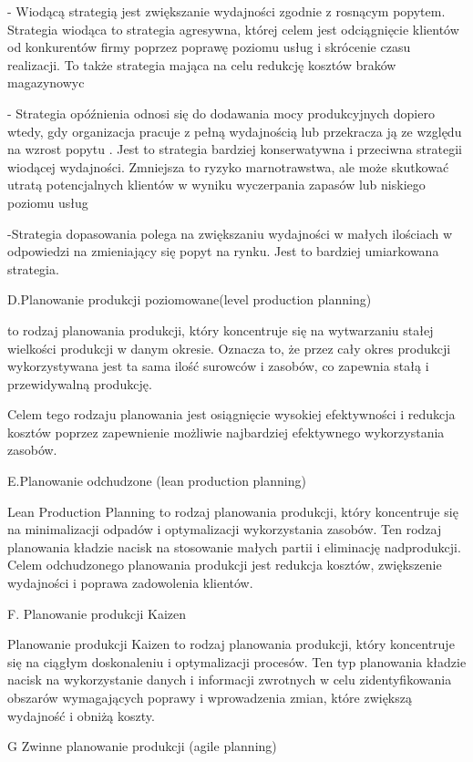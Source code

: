  -  Wiodącą strategią jest zwiększanie wydajności zgodnie z rosnącym popytem. Strategia wiodąca to strategia agresywna, której celem jest odciągnięcie klientów od konkurentów firmy poprzez poprawę poziomu usług i skrócenie czasu realizacji. To także strategia mająca na celu redukcję kosztów braków magazynowyc

 -    Strategia opóźnienia odnosi się do dodawania mocy produkcyjnych dopiero wtedy, gdy organizacja pracuje z pełną wydajnością lub przekracza ją ze względu na wzrost popytu . Jest to strategia bardziej konserwatywna i przeciwna strategii wiodącej wydajności. Zmniejsza to ryzyko marnotrawstwa, ale może skutkować utratą potencjalnych klientów w wyniku wyczerpania zapasów lub niskiego poziomu usług

 -Strategia dopasowania polega na zwiększaniu wydajności w małych ilościach w odpowiedzi na zmieniający się popyt na rynku. Jest to bardziej umiarkowana strategia.

 D.Planowanie produkcji poziomowane(level production planning)

 to rodzaj planowania produkcji, który koncentruje się na wytwarzaniu stałej wielkości produkcji w danym okresie. Oznacza to, że przez cały okres produkcji wykorzystywana jest ta sama ilość surowców i zasobów, co zapewnia stałą i przewidywalną produkcję.

Celem tego rodzaju planowania jest osiągnięcie wysokiej efektywności i redukcja kosztów poprzez zapewnienie możliwie najbardziej efektywnego wykorzystania zasobów.

E.Planowanie odchudzone (lean production planning)

Lean Production Planning to rodzaj planowania produkcji, który koncentruje się na minimalizacji odpadów i optymalizacji wykorzystania zasobów. Ten rodzaj planowania kładzie nacisk na stosowanie małych partii i eliminację nadprodukcji. Celem odchudzonego planowania produkcji jest redukcja kosztów, zwiększenie wydajności i poprawa zadowolenia klientów.

F. Planowanie produkcji Kaizen

Planowanie produkcji Kaizen to rodzaj planowania produkcji, który koncentruje się na ciągłym doskonaleniu i optymalizacji procesów. Ten typ planowania kładzie nacisk na wykorzystanie danych i informacji zwrotnych w celu zidentyfikowania obszarów wymagających poprawy i wprowadzenia zmian, które zwiększą wydajność i obniżą koszty.

G Zwinne planowanie produkcji (agile planning)

